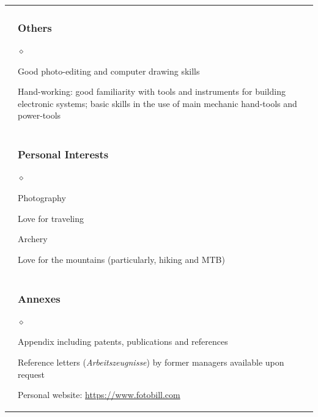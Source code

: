 \documentclass[a4paper]{article}
\def\sito{https://www.fotobill.com}
\newlength{\sectsep}
\newlength{\subsectsep}
\renewenvironment{itemize}{
  \begin{list}{$\diamond$}{
    \setlength{\topsep}{0.25em}
    \setlength{\itemsep}{0em}
    \setlength{\parskip}{0pt}
    \setlength{\parsep}{0em}
  }
}{
  \end{list}
}
\begin{document}
\begin{longtable}{r || l}
  & \begin{minipage}{0.9\textwidth}
      \vspace{\subsectsep}
      \subsubsection*{Others}
      \begin{itemize}
          \item Good photo-editing and computer drawing skills
          \item Hand-working: good familiarity with tools and instruments for building electronic systems; basic skills in the use of main mechanic hand-tools and power-tools
      \end{itemize}
  \end{minipage} \\[\sectsep]

  & \begin{minipage}{0.9\textwidth}
      \vspace{\subsectsep}
      \subsubsection*{Personal Interests}
      \begin{itemize}
          \item Photography
          \item Love for traveling
          \item Archery
          \item Love for the mountains (particularly, hiking and MTB)
      \end{itemize}
  \end{minipage} \\[\sectsep]

  & \begin{minipage}{0.9\textwidth}
      \vspace{\subsectsep}
      \subsubsection*{Annexes}
      \begin{itemize}
          \item Appendix including patents, publications and references
          \item Reference letters (\emph{Arbeitszeugnisse}) by former managers available upon request
          \item Personal website: \href{\sito}{\sito}
      \end{itemize}
      \vfill
    \end{minipage} \\

  \end{longtable}
\end{document}

